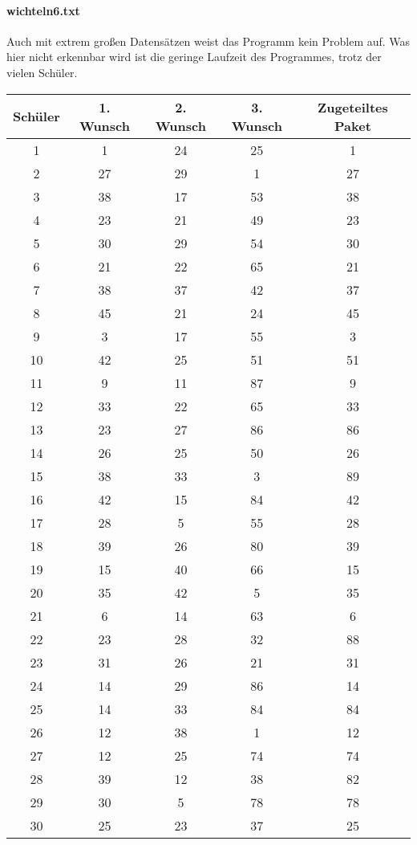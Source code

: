 \documentclass[a4paper,10pt,ngerman]{scrartcl}
\begin{document}
\paragraph{wichteln6.txt}
Auch mit extrem großen Datensätzen weist das Programm kein Problem auf.
Was hier nicht erkennbar wird ist die geringe Laufzeit des Programmes, trotz der vielen Schüler.
\begin{longtable}[c]{c|c|c|c|c}
    Schüler & 1. Wunsch & 2. Wunsch & 3. Wunsch & Zugeteiltes Paket \\
    \hline
    \endhead
    1 & 1 & 24 & 25 & 1 \\
    2 & 27 & 29 & 1 & 27 \\
    3 & 38 & 17 & 53 & 38 \\
    4 & 23 & 21 & 49 & 23 \\
    5 & 30 & 29 & 54 & 30 \\
    6 & 21 & 22 & 65 & 21 \\
    7 & 38 & 37 & 42 & 37 \\
    8 & 45 & 21 & 24 & 45 \\
    9 & 3 & 17 & 55 & 3 \\
    10 & 42 & 25 & 51 & 51 \\
    11 & 9 & 11 & 87 & 9 \\
    12 & 33 & 22 & 65 & 33 \\
    13 & 23 & 27 & 86 & 86 \\
    14 & 26 & 25 & 50 & 26 \\
    15 & 38 & 33 & 3 & 89 \\
    16 & 42 & 15 & 84 & 42 \\
    17 & 28 & 5 & 55 & 28 \\
    18 & 39 & 26 & 80 & 39 \\
    19 & 15 & 40 & 66 & 15 \\
    20 & 35 & 42 & 5 & 35 \\
    21 & 6 & 14 & 63 & 6 \\
    22 & 23 & 28 & 32 & 88 \\
    23 & 31 & 26 & 21 & 31 \\
    24 & 14 & 29 & 86 & 14 \\
    25 & 14 & 33 & 84 & 84 \\
    26 & 12 & 38 & 1 & 12 \\
    27 & 12 & 25 & 74 & 74 \\
    28 & 39 & 12 & 38 & 82 \\
    29 & 30 & 5 & 78 & 78 \\
    30 & 25 & 23 & 37 & 25 \\

\end{longtable}
\end{document}
